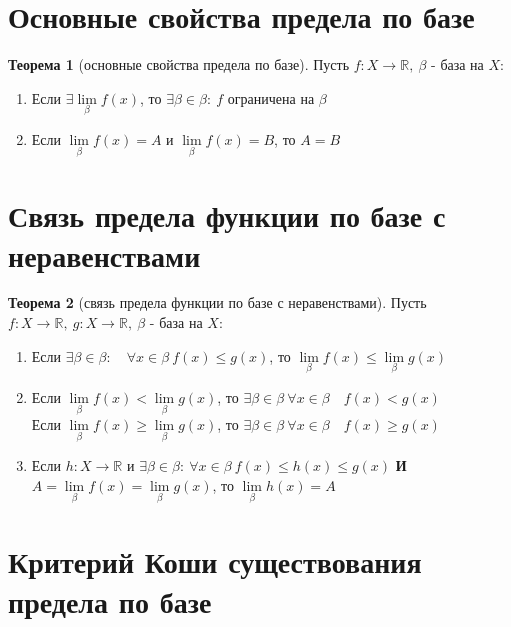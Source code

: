 \documentclass{report}
\theoremstyle{definition}
\newtheorem*{theorem}{Теорема}
\begin{document}
\section{Основные свойства предела по базе}

\begin{theorem}[основные свойства предела по базе]
    Пусть $f:X\rightarrow\mathbb{R}, \ \beta$ - база на $X$:
    \begin{enumerate}
        \item Если $\exists \underset{\beta}{\lim}f(x)$, то $\exists \beta \in \beta: \ f$ ограничена на $\beta$
        \item Если $\underset{\beta}{\lim}f(x) = A$ и $\underset{\beta}{\lim}f(x) = B$, то $A = B$
    \end{enumerate}
\end{theorem}

\section{Связь предела функции по базе с неравенствами}

\begin{theorem}[связь предела функции по базе с неравенствами]
    Пусть $f:X\rightarrow\mathbb{R}, \ g:X\rightarrow\mathbb{R}, \ \beta$ - база на $X$:
    \begin{enumerate}
        \item Если $\exists\beta\in\beta: \quad \forall x \in \beta \ f(x) \leqslant g(x)$, то $\underset{\beta}
                  {\lim}f(x) \leqslant \underset{\beta}{\lim}g(x)$
        \item Если $\underset{\beta}{\lim}f(x) < \underset{\beta}{\lim}g(x)$, то $\exists\beta\in\beta \ \forall
                  x \in \beta \quad f(x) < g(x)$\\

              Если $\underset{\beta}{\lim}f(x) \geqslant \underset{\beta}{\lim}g(x)$, то $\exists\beta\in\beta \ \forall
                  x \in \beta \quad f(x) \geqslant g(x)$
        \item Если $h:X\rightarrow \mathbb{R}$ и $\exists\beta\in\beta: \ \forall x \in \beta \ f(x) \leqslant h(x)
                  \leqslant g(x)$ \textbf{И} $A = \underset{\beta}{\lim}f(x) = \underset{\beta}{\lim}g(x)$, то $\underset{\beta}
                  {\lim}h(x) = A$
    \end{enumerate}
\end{theorem}

\section{Критерий Коши существования предела по базе}
\end{document}
